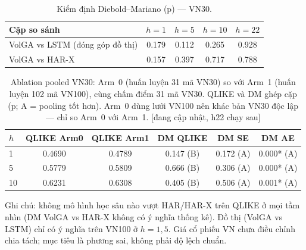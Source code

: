 \documentclass[11pt]{article}
\begin{document}
\begin{table}[h]\centering
\caption{Kiểm định Diebold--Mariano (p) --- VN30.}
\begin{tabular}{lcccc}
\toprule
Cặp so sánh & $h{=}1$ & $h{=}5$ & $h{=}10$ & $h{=}22$ \\
\midrule
VolGA vs LSTM (đóng góp đồ thị) & 0.179 & 0.112 & 0.265 & 0.928 \\
VolGA vs HAR-X & 0.157 & 0.397 & 0.717 & 0.788 \\
\bottomrule
\end{tabular}
\end{table}

\begin{table}[h]\centering
\caption{Ablation pooled VN30: Arm~0 (huấn luyện 31 mã VN30) so với Arm~1 (huấn luyện 102 mã VN100), cùng chấm điểm 31 mã VN30. QLIKE và DM ghép cặp (p; A = pooling tốt hơn). Arm~0 dùng lưới VN100 nên khác bản VN30 độc lập --- chỉ so Arm~0 với Arm~1. [đang cập nhật, h22 chạy sau]}
\begin{tabular}{lccccc}
\toprule
$h$ & QLIKE Arm0 & QLIKE Arm1 & DM QLIKE & DM SE & DM AE \\
\midrule
1 & 0.4690 & 0.4789 & 0.147 (B) & 0.172 (A) & 0.000* (A) \\
5 & 0.5779 & 0.5809 & 0.666 (B) & 0.306 (A) & 0.000* (A) \\
10 & 0.6231 & 0.6308 & 0.405 (B) & 0.506 (A) & 0.001* (A) \\
\bottomrule
\end{tabular}
\end{table}

\FloatBarrier
\noindent\footnotesize Ghi chú: không mô hình học sâu nào vượt HAR/HAR-X trên QLIKE ở mọi tầm nhìn (DM VolGA vs HAR-X không có ý nghĩa thống kê). Đồ thị (VolGA vs LSTM) chỉ có ý nghĩa trên VN100 ở $h{=}1,5$. Giá cổ phiếu VN chưa điều chỉnh chia tách; mục tiêu là phương sai, không phải độ lệch chuẩn.
\end{document}
